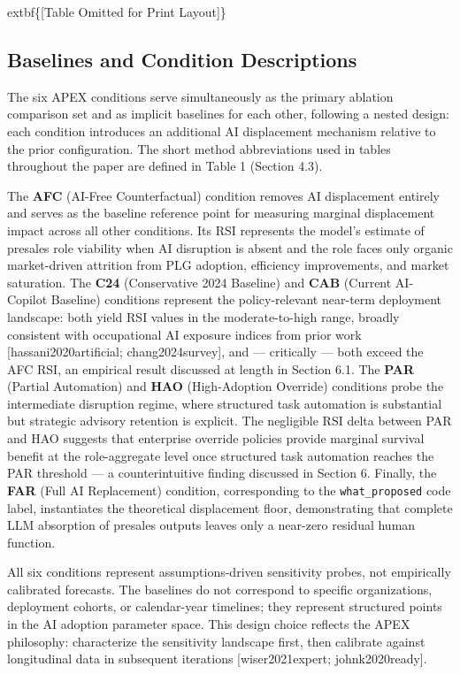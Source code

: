 \documentclass[10pt, conference]{IEEEtran}
\begin{document}
{	extbf\{[Table Omitted for Print Layout]\}

\subsection{Baselines and Condition Descriptions}

\label{sec:baselines_and_condition_descriptions}

The six APEX conditions serve simultaneously as the primary ablation comparison set and as implicit baselines for each other, following a nested design: each condition introduces an additional AI displacement mechanism relative to the prior configuration. The short method abbreviations used in tables throughout the paper are defined in Table 1 (Section 4.3).

The \textbf{AFC} (AI-Free Counterfactual) condition removes AI displacement entirely and serves as the baseline reference point for measuring marginal displacement impact across all other conditions. Its RSI represents the model's estimate of presales role viability when AI disruption is absent and the role faces only organic market-driven attrition from PLG adoption, efficiency improvements, and market saturation. The \textbf{C24} (Conservative 2024 Baseline) and \textbf{CAB} (Current AI-Copilot Baseline) conditions represent the policy-relevant near-term deployment landscape: both yield RSI values in the moderate-to-high range, broadly consistent with occupational AI exposure indices from prior work [hassani2020artificial; chang2024survey], and --- critically --- both exceed the AFC RSI, an empirical result discussed at length in Section 6.1. The \textbf{PAR} (Partial Automation) and \textbf{HAO} (High-Adoption Override) conditions probe the intermediate disruption regime, where structured task automation is substantial but strategic advisory retention is explicit. The negligible RSI delta between PAR and HAO suggests that enterprise override policies provide marginal survival benefit at the role-aggregate level once structured task automation reaches the PAR threshold --- a counterintuitive finding discussed in Section 6. Finally, the \textbf{FAR} (Full AI Replacement) condition, corresponding to the \texttt{what\_proposed} code label, instantiates the theoretical displacement floor, demonstrating that complete LLM absorption of presales outputs leaves only a near-zero residual human function.

All six conditions represent assumptions-driven sensitivity probes, not empirically calibrated forecasts. The baselines do not correspond to specific organizations, deployment cohorts, or calendar-year timelines; they represent structured points in the AI adoption parameter space. This design choice reflects the APEX philosophy: characterize the sensitivity landscape first, then calibrate against longitudinal data in subsequent iterations [wiser2021expert; johnk2020ready].

}
\end{document}
